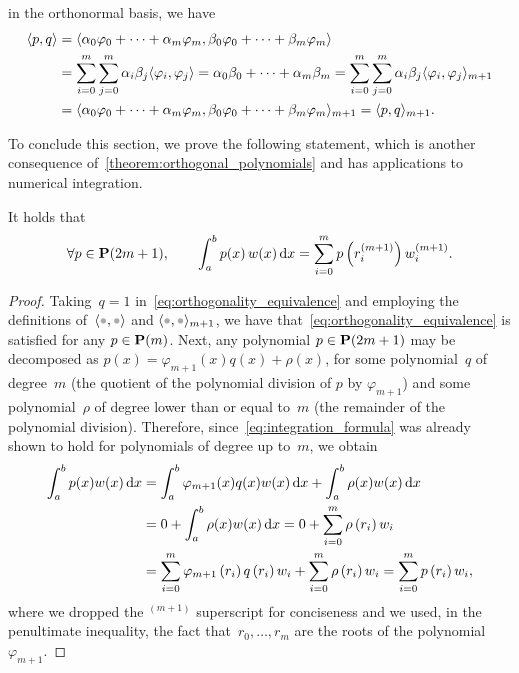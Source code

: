 in the orthonormal basis,
we have
\begin{align*}
    \langle p, q\rangle
    &= \langle\alpha_0 \varphi_0 + \dotsb + \alpha_m \varphi_m,\beta_0 \varphi_0 + \dotsb + \beta_m \varphi_m\rangle \\
    &= \sum_{i=0}^{m} \sum_{j=0}^{m} \alpha_i \beta_j \langle\varphi_i, \varphi_j\rangle
    = \alpha_0 \beta_0 + \dotsb + \alpha_m \beta_m
    = \sum_{i=0}^{m} \sum_{j=0}^{m} \alpha_i \beta_j \langle\varphi_i, \varphi_j\rangle_{m+1} \\
    & = \langle\alpha_0 \varphi_0 + \dotsb + \alpha_m \varphi_m,\beta_0 \varphi_0 + \dotsb + \beta_m \varphi_m\rangle_{m+1} = \langle p,q\rangle_{m+1}.
\end{align*}

To conclude this section,
we prove the following statement,
which is another consequence of~\cref{theorem:orthogonal_polynomials} and has applications to numerical integration.
\begin{theorem}
It holds that
\begin{equation}
    \label{eq:integration_formula}
    \forall p \in \mathbf P(2m+1),
    \qquad \int_{a}^{b} p(x) \, w(x) \, \mathrm d x
    = \sum_{i=0}^{m} p\left(r_i^{(m+1)}\right) w^{(m+1)}_i.
\end{equation}
\end{theorem}
\begin{proof}
    Taking~$q = 1$ in~\eqref{eq:orthogonality_equivalence} and employing the definitions of~$\ip{\placeholder, \placeholder}$ and $\ip{\placeholder, \placeholder}_{m+1}$,
    we have that~\eqref{eq:orthogonality_equivalence} is satisfied for any $p \in \mathbf P(m)$.
    Next, any polynomial $p \in \mathbf P(2m+1)$ may be decomposed as $p(x) = \varphi_{m+1}(x) q(x) + \rho(x)$,
    for some polynomial~$q$ of degree~$m$ (the quotient of the polynomial division of $p$ by $\varphi_{m+1}$) and some polynomial~$\rho$ of degree lower than or equal to~$m$ (the remainder of the polynomial division).
    Therefore, since~\eqref{eq:integration_formula} was already shown to hold for polynomials of degree up to~$m$,
    we obtain
    \begin{align*}
        \int_{a}^{b} p(x) w(x) \, \mathrm d x
        &= \int_{a}^{b} \varphi_{m+1}(x) q(x) w(x) \, \mathrm d x + \int_{a}^{b} \rho(x) w(x) \, \mathrm d x \\
        &= 0 + \int_{a}^{b} \rho(x) w(x) \, \mathrm d x
        = 0 + \sum_{i=0}^{m} \rho\left(r_i\right) w_i \\
        &= \sum_{i=0}^{m} \varphi_{m+1}\left(r_i\right) q\left(r_i\right)  w_i + \sum_{i=0}^{m} \rho\left(r_i\right) w_i = \sum_{i=0}^{m} p\left(r_i\right) w_i,
    \end{align*}
    where we dropped the $^{(m+1)}$ superscript for conciseness and
    we used, in the penultimate inequality,
    the fact that~$r_0, \dotsc, r_m$ are the roots of the polynomial~$\varphi_{m+1}$.
\end{proof}
